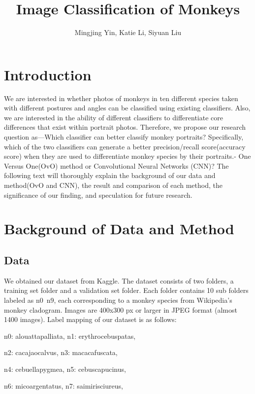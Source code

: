 \documentclass[12pt, letterpaper]{article}
\title{Image Classification of Monkeys}
\author{Mingjing Yin, Katie Li, Siyuan Liu}
\begin{document}
\maketitle


\section{Introduction}
 \quad \quad We are interested in whether photos of monkeys in ten different species taken with different postures and angles can be classified using existing classifiers. Also, we are interested in the ability of different classifiers to differentiate core differences that exist within portrait photos. Therefore, we propose our research question as---Which classifier can better classify monkey portraits? Specifically, which of the two classifiers can generate a better precision/recall score(accuracy score) when they are used to differentiate monkey species by their portraits.- One Versus One(OvO) method or Convolutional Neural Networks (CNN)? The following text will thoroughly explain the background of our data and method(OvO and CNN), the result and comparison of each method, the significance of our finding, and speculation for future research.


\section{Background of Data and Method}

\subsection{Data}

         \quad \quad We obtained our dataset from Kaggle. The dataset consists of two folders, a training set folder and a validation set folder. Each folder contains 10 sub folders labeled as n0~n9, each corresponding to a monkey species from Wikipedia's monkey cladogram. Images are 400x300 px or larger in JPEG format (almost 1400 images). Label mapping of our dataset is as follows:
         
         \bigskip
       
     n0: alouattapalliata, n1: erythrocebuspatas,
 
    n2: cacajaocalvus, n3: macacafuscata,
 
    n4: cebuellapygmea, n5: cebuscapucinus,
 
    n6: micoargentatus, n7: saimirisciureus,
    
\end{document}
